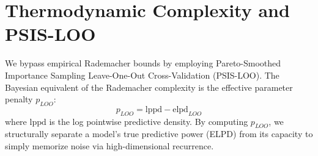 \documentclass[11pt, a4paper]{article}
\begin{document}
\section{Thermodynamic Complexity and PSIS-LOO}
We bypass empirical Rademacher bounds by employing Pareto-Smoothed Importance Sampling Leave-One-Out Cross-Validation (PSIS-LOO). The Bayesian equivalent of the Rademacher complexity is the effective parameter penalty $p_{LOO}$:
\begin{equation}
p_{LOO} = \text{lppd} - \text{elpd}_{LOO}
\end{equation}
where $\text{lppd}$ is the log pointwise predictive density. By computing $p_{LOO}$, we structurally separate a model's true predictive power (ELPD) from its capacity to simply memorize noise via high-dimensional recurrence. 
\end{document}
